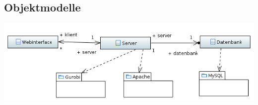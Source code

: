 \documentclass[parskip=full]{scrartcl}
\newcommand{\swtLabel}[1]{\textbf{/#1\arabic*0/}}
\begin{document}
\begin{enumerate} [label=\swtLabel{B}]
\end{enumerate}



\subsection{Objektmodelle}

\includegraphics[width=\linewidth]{diagramme_pflichtenheft/ClassDiagram.PNG}

\end{document}

